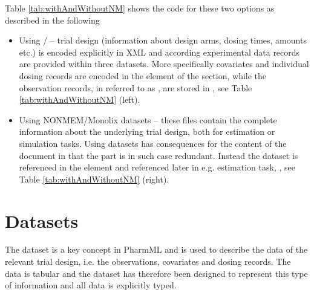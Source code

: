 Table \ref{tab:withAndWithoutNM} shows the \pml code for these two options 
as described in the following
\begin{itemize} 
\item
Using / -- trial design (information about 
design arms, dosing times, amounts etc.) is encoded explicitly in XML and according 
experimental data records are provided within three datasets.
More specifically covariates and individual dosing records are encoded in 
the  element of the  section, while the
observation records, in \pml referred to as , are stored 
in , see Table \ref{tab:withAndWithoutNM} (left).
\item
Using NONMEM/Monolix datasets -- these files contain the complete information 
about the underlying trial design, both for estimation or simulation tasks. 
Using datasets has consequences for the content of the \pml document 
in that the  part is in such case redundant. Instead the dataset
is referenced in the  element and referenced later in e.g.
estimation task, , see Table \ref{tab:withAndWithoutNM}
(right).
\end{itemize}


\section{Datasets}
\label{sec:datasets}

The dataset is a key concept in PharmML and is used to describe the data 
of the relevant trial design, i.e. the observations, covariates and dosing
records. 
The data is tabular and the dataset has therefore been designed to 
represent this type of information and all data is explicitly typed.


